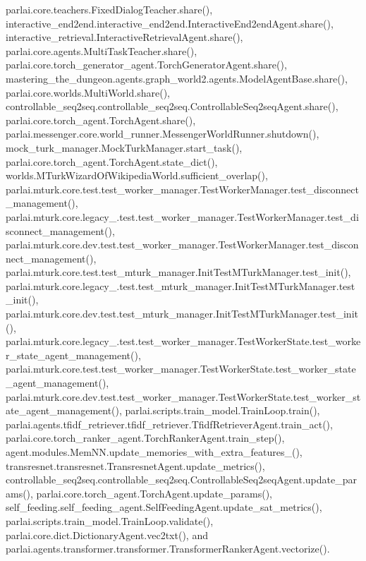 parlai.\+core.\+teachers.\+Fixed\+Dialog\+Teacher.\+share(), interactive\+\_\+end2end.\+interactive\+\_\+end2end.\+Interactive\+End2end\+Agent.\+share(), interactive\+\_\+retrieval.\+Interactive\+Retrieval\+Agent.\+share(), parlai.\+core.\+agents.\+Multi\+Task\+Teacher.\+share(), parlai.\+core.\+torch\+\_\+generator\+\_\+agent.\+Torch\+Generator\+Agent.\+share(), mastering\+\_\+the\+\_\+dungeon.\+agents.\+graph\+\_\+world2.\+agents.\+Model\+Agent\+Base.\+share(), parlai.\+core.\+worlds.\+Multi\+World.\+share(), controllable\+\_\+seq2seq.\+controllable\+\_\+seq2seq.\+Controllable\+Seq2seq\+Agent.\+share(), parlai.\+core.\+torch\+\_\+agent.\+Torch\+Agent.\+share(), parlai.\+messenger.\+core.\+world\+\_\+runner.\+Messenger\+World\+Runner.\+shutdown(), mock\+\_\+turk\+\_\+manager.\+Mock\+Turk\+Manager.\+start\+\_\+task(), parlai.\+core.\+torch\+\_\+agent.\+Torch\+Agent.\+state\+\_\+dict(), worlds.\+M\+Turk\+Wizard\+Of\+Wikipedia\+World.\+sufficient\+\_\+overlap(), parlai.\+mturk.\+core.\+test.\+test\+\_\+worker\+\_\+manager.\+Test\+Worker\+Manager.\+test\+\_\+disconnect\+\_\+management(), parlai.\+mturk.\+core.\+legacy\+\_.\+test.\+test\+\_\+worker\+\_\+manager.\+Test\+Worker\+Manager.\+test\+\_\+disconnect\+\_\+management(), parlai.\+mturk.\+core.\+dev.\+test.\+test\+\_\+worker\+\_\+manager.\+Test\+Worker\+Manager.\+test\+\_\+disconnect\+\_\+management(), parlai.\+mturk.\+core.\+test.\+test\+\_\+mturk\+\_\+manager.\+Init\+Test\+M\+Turk\+Manager.\+test\+\_\+init(), parlai.\+mturk.\+core.\+legacy\+\_.\+test.\+test\+\_\+mturk\+\_\+manager.\+Init\+Test\+M\+Turk\+Manager.\+test\+\_\+init(), parlai.\+mturk.\+core.\+dev.\+test.\+test\+\_\+mturk\+\_\+manager.\+Init\+Test\+M\+Turk\+Manager.\+test\+\_\+init(), parlai.\+mturk.\+core.\+legacy\+\_.\+test.\+test\+\_\+worker\+\_\+manager.\+Test\+Worker\+State.\+test\+\_\+worker\+\_\+state\+\_\+agent\+\_\+management(), parlai.\+mturk.\+core.\+test.\+test\+\_\+worker\+\_\+manager.\+Test\+Worker\+State.\+test\+\_\+worker\+\_\+state\+\_\+agent\+\_\+management(), parlai.\+mturk.\+core.\+dev.\+test.\+test\+\_\+worker\+\_\+manager.\+Test\+Worker\+State.\+test\+\_\+worker\+\_\+state\+\_\+agent\+\_\+management(), parlai.\+scripts.\+train\+\_\+model.\+Train\+Loop.\+train(), parlai.\+agents.\+tfidf\+\_\+retriever.\+tfidf\+\_\+retriever.\+Tfidf\+Retriever\+Agent.\+train\+\_\+act(), parlai.\+core.\+torch\+\_\+ranker\+\_\+agent.\+Torch\+Ranker\+Agent.\+train\+\_\+step(), agent.\+modules.\+Mem\+N\+N.\+update\+\_\+memories\+\_\+with\+\_\+extra\+\_\+features\+\_\+(), transresnet.\+transresnet.\+Transresnet\+Agent.\+update\+\_\+metrics(), controllable\+\_\+seq2seq.\+controllable\+\_\+seq2seq.\+Controllable\+Seq2seq\+Agent.\+update\+\_\+params(), parlai.\+core.\+torch\+\_\+agent.\+Torch\+Agent.\+update\+\_\+params(), self\+\_\+feeding.\+self\+\_\+feeding\+\_\+agent.\+Self\+Feeding\+Agent.\+update\+\_\+sat\+\_\+metrics(), parlai.\+scripts.\+train\+\_\+model.\+Train\+Loop.\+validate(), parlai.\+core.\+dict.\+Dictionary\+Agent.\+vec2txt(), and parlai.\+agents.\+transformer.\+transformer.\+Transformer\+Ranker\+Agent.\+vectorize().


